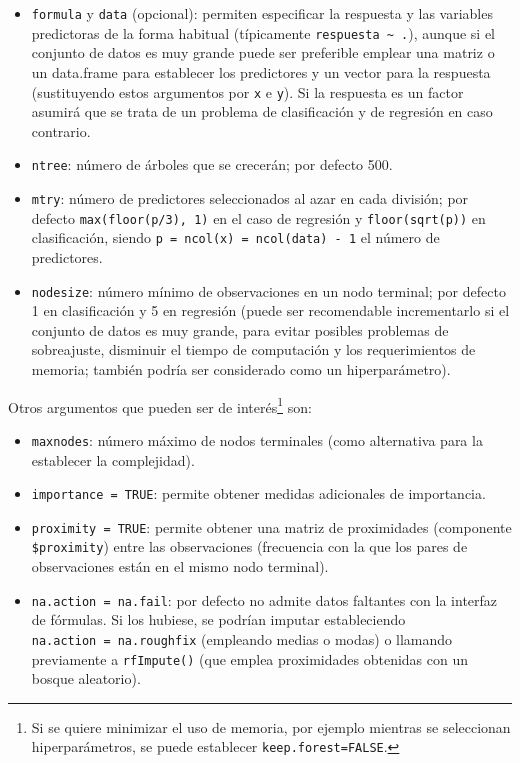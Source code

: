 \documentclass[
]{book}
\theoremstyle{break}
\theoremstyle{definition}
\theoremstyle{definition}
\theoremstyle{definition}
\theoremstyle{remark}
\begin{document}
\begin{itemize}
\item
  \texttt{formula} y \texttt{data} (opcional): permiten especificar la respuesta y las variables predictoras de la forma habitual (típicamente \texttt{respuesta\ \textasciitilde{}\ .}), aunque si el conjunto de datos es muy grande puede ser preferible emplear una matriz o un data.frame para establecer los predictores y un vector para la respuesta (sustituyendo estos argumentos por \texttt{x} e \texttt{y}).
  Si la respuesta es un factor asumirá que se trata de un problema de clasificación y de regresión en caso contrario.
\item
  \texttt{ntree}: número de árboles que se crecerán; por defecto 500.
\item
  \texttt{mtry}: número de predictores seleccionados al azar en cada división; por defecto \texttt{max(floor(p/3),\ 1)} en el caso de regresión y \texttt{floor(sqrt(p))} en clasificación, siendo \texttt{p\ =\ ncol(x)\ =\ ncol(data)\ -\ 1} el número de predictores.
\item
  \texttt{nodesize}: número mínimo de observaciones en un nodo terminal; por defecto 1 en clasificación y 5 en regresión (puede ser recomendable incrementarlo si el conjunto de datos es muy grande, para evitar posibles problemas de sobreajuste, disminuir el tiempo de computación y los requerimientos de memoria; también podría ser considerado como un hiperparámetro).
\end{itemize}

Otros argumentos que pueden ser de interés\footnote{Si se quiere minimizar el uso de memoria, por ejemplo mientras se seleccionan hiperparámetros, se puede establecer \texttt{keep.forest=FALSE}.} son:

\begin{itemize}
\item
  \texttt{maxnodes}: número máximo de nodos terminales (como alternativa para la establecer la complejidad).
\item
  \texttt{importance\ =\ TRUE}: permite obtener medidas adicionales de importancia.
\item
  \texttt{proximity\ =\ TRUE}: permite obtener una matriz de proximidades (componente \texttt{\$proximity}) entre las observaciones (frecuencia con la que los pares de observaciones están en el mismo nodo terminal).
\item
  \texttt{na.action\ =\ na.fail}: por defecto no admite datos faltantes con la interfaz de fórmulas. Si los hubiese, se podrían imputar estableciendo \texttt{na.action\ =\ na.roughfix} (empleando medias o modas) o llamando previamente a \texttt{rfImpute()} (que emplea proximidades obtenidas con un bosque aleatorio).
\end{itemize}
\end{document}

